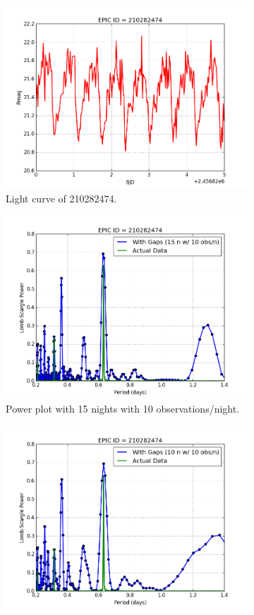 \documentclass[letterpaper,11pt]{article}
\begin{document}
\begin{figure}[H]
\centering
\begin{subfigure}{.5\textwidth}
  \centering
  \includegraphics[width=.9\linewidth]{figures/EPICID.png}
  \caption{Light curve of 210282474.}
  \label{fig:Lcurve}
\end{subfigure}%
\begin{subfigure}{.5\textwidth}
  \centering
  \includegraphics[width=.9\linewidth]{figures/1510Actual.png}
  \caption{Power plot with 15 nights with 10 observations/night.}
  \label{fig:1510}
\end{subfigure}
\begin{subfigure}{.5\textwidth}
  \centering
  \includegraphics[width=.9\linewidth]{figures/1010Actual.png}

\end{subfigure}
\end{figure}
\end{document}
